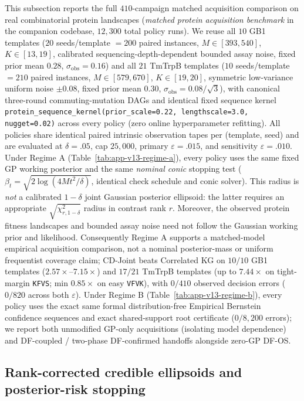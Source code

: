 \documentclass{article}
\theoremstyle{plain}
\theoremstyle{definition}
\begin{document}
This subsection reports the full $410$-campaign matched acquisition comparison on real combinatorial protein landscapes (\emph{matched protein acquisition benchmark} in the companion codebase, $12{,}300$ total policy runs). We reuse all $10$ GB1 templates ($20$ seeds/template $=200$ paired instances, $M\in[393,540]$, $K\in[13,19]$, calibrated sequencing-depth-dependent bounded assay noise, fixed prior mean $0.28$, $\sigma_{\mathrm{obs}}=0.16$) and all $21$ TmTrpB templates ($10$ seeds/template $=210$ paired instances, $M\in[579,670]$, $K\in[19,20]$, symmetric low-variance uniform noise $\pm 0.08$, fixed prior mean $0.30$, $\sigma_{\mathrm{obs}}=0.08/\sqrt{3}$), with canonical three-round commuting-mutation DAGs and identical fixed sequence kernel \texttt{protein\_sequence\_kernel(prior\_scale=0.22, lengthscale=3.0, nugget=0.02)} across every policy (zero online hyperparameter refitting). All policies share identical paired intrinsic observation tapes per (template, seed) and are evaluated at $\delta=.05$, cap $25{,}000$, primary $\varepsilon=.015$, and sensitivity $\varepsilon=.010$. Under Regime A (Table~\ref{tab:app-v13-regime-a}), every policy uses the same fixed GP working posterior and the same \emph{nominal conic} stopping test ($\beta_t=\sqrt{2\log(4Mt^2/\delta)}$, identical check schedule and conic solver). This radius is \emph{not} a calibrated $1-\delta$ joint Gaussian posterior ellipsoid: the latter requires an appropriate $\sqrt{\chi^2_{r,1-\delta}}$ radius in contrast rank $r$. Moreover, the observed protein fitness landscapes and bounded assay noise need not follow the Gaussian working prior and likelihood. Consequently Regime A supports a matched-model empirical acquisition comparison, not a nominal posterior-mass or uniform frequentist coverage claim; CD-Joint beats Correlated KG on $10/10$ GB1 templates ($2.57\times$--$7.15\times$) and $17/21$ TmTrpB templates (up to $7.44\times$ on tight-margin \texttt{KFVS}; min $0.85\times$ on easy \texttt{VFVK}), with $0/410$ observed decision errors ($0/820$ across both $\varepsilon$). Under Regime B (Table~\ref{tab:app-v13-regime-b}), every policy uses the exact same formal distribution-free Empirical Bernstein confidence sequences and exact shared-support root certificate ($0/8{,}200$ errors); we report both unmodified GP-only acquisitions (isolating model dependence) and DF-coupled / two-phase DF-confirmed handoffs alongside zero-GP DF-OS.

\subsection{Rank-corrected credible ellipsoids and posterior-risk stopping}
\label{app:v14-protein-credible}
\end{document}
